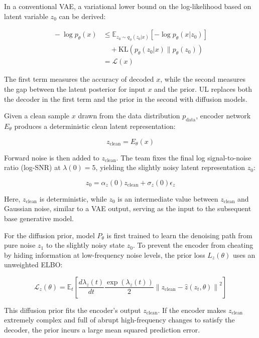 In a conventional VAE, a variational lower bound on the log-likelihood based on latent variable \(z_0\) can be derived:

\[
\begin{aligned}
{}-\log p_\theta(x)
&\le
\mathbb{E}_{z_0\sim q_\phi(z_0|x)}
\left[-\log p_\theta(x|z_0)\right]
\\
&\quad +
\mathrm{KL}(p_\theta(z_0|x)\|p_\theta(z_0))
\\
&=
\mathcal{L}(x)
\end{aligned}
\]

The first term measures the accuracy of decoded \(x\), while the second measures the gap between the latent posterior for input \(x\) and the prior. UL replaces both the decoder in the first term and the prior in the second with diffusion models.

Given a clean sample \(x\) drawn from the data distribution \(p_{\mathrm{data}}\), encoder network \(E_\theta\) produces a deterministic clean latent representation:

\[
z_{\mathrm{clean}}=E_\theta(x)
\]

Forward noise is then added to \(z_{\mathrm{clean}}\). The team fixes the final log signal-to-noise ratio (log-SNR) at \(\lambda(0)=5\), yielding the slightly noisy latent representation \(z_0\):

\[
z_0=\alpha_z(0)z_{\mathrm{clean}}+\sigma_z(0)\epsilon_z
\]

Here, \(z_{\mathrm{clean}}\) is deterministic, while \(z_0\) is an intermediate value between \(z_{\mathrm{clean}}\) and Gaussian noise, similar to a VAE output, serving as the input to the subsequent base generative model.

For the diffusion prior, model \(P_\theta\) is first trained to learn the denoising path from pure noise \(z_1\) to the slightly noisy state \(z_0\). To prevent the encoder from cheating by hiding information at low-frequency noise levels, the prior loss \(L_z(\theta)\) uses an unweighted ELBO:

\[
\mathcal{L}_z(\theta)=
\mathbb{E}_t
\left[
\frac{d\lambda_z(t)}{dt}
\frac{\exp(\lambda_z(t))}{2}
\left\|
z_{\mathrm{clean}}-\hat{z}(z_t,\theta)
\right\|^2
\right]
\]

This diffusion prior fits the encoder's output \(z_{\mathrm{clean}}\). If the encoder makes \(z_{\mathrm{clean}}\) extremely complex and full of abrupt high-frequency changes to satisfy the decoder, the prior incurs a large mean squared prediction error.

